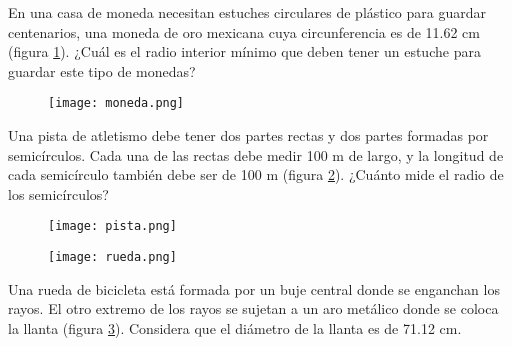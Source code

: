 \begin{enumerate}
          \begin{minipage}[t]{0.7\textwidth}
              \item En una casa de moneda necesitan estuches circulares de
              plástico para guardar centenarios, una moneda de oro mexicana cuya circunferencia es de 11.62 cm (figura \ref{fig:moneda}). ¿Cuál
              es el radio interior mínimo que deben tener un estuche para guardar este tipo de monedas?
          \end{minipage}\hfill
          \begin{minipage}[t]{0.2\textwidth}
              \begin{figure}[H]
                  \centering
                  \texttt{[image: moneda.png]}
                  \label{fig:moneda}
              \end{figure}
          \end{minipage}



          \begin{minipage}[t]{0.7\textwidth}
              \item Una pista de atletismo debe tener dos partes rectas y dos partes formadas por
              semicírculos. Cada una de las rectas debe medir 100 m de largo, y la longitud de
              cada semicírculo también debe ser de 100 m (figura \ref{fig:pista}). ¿Cuánto mide el radio de los semicírculos?
          \end{minipage}\hfill
          \begin{minipage}[t]{0.2\textwidth}
              \begin{figure}[H]
                  \centering
                  \texttt{[image: pista.png]}
                  \label{fig:pista}
              \end{figure}
          \end{minipage}

          \begin{minipage}[t]{0.2\textwidth}
              \begin{figure}[H]
                  \centering
                  \texttt{[image: rueda.png]}
                  \label{fig:rueda}
              \end{figure}
          \end{minipage}\hfill
          \begin{minipage}[t]{0.7\textwidth}
              \item Una rueda de bicicleta está formada por un buje central donde se enganchan los
              rayos. El otro extremo de los rayos se sujetan a un aro metálico donde se coloca
              la llanta (figura \ref{fig:rueda}). Considera que el diámetro de la llanta es de 71.12 cm.


\end{minipage}
\end{enumerate}
